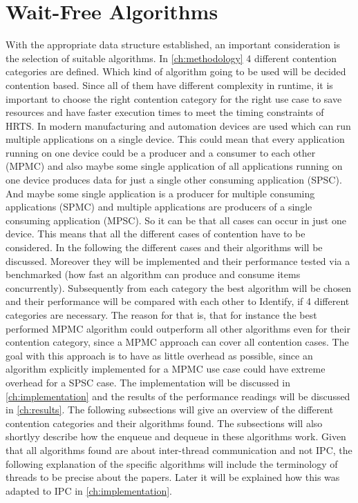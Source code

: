 \section{Wait-Free Algorithms}\label{sec:wait-free-alg}
With the appropriate data structure established, an important consideration is the selection of suitable algorithms. In \cref{ch:methodology} 4 different contention categories are defined. Which kind of algorithm going to be used will be decided contention based. Since all of them have different complexity in runtime, it is important to choose the right contention category for the right use case to save resources and have faster execution times to meet the timing constraints of \ac{HRTS}. In modern manufacturing and automation devices are used which can run multiple applications on a single device. This could mean that every application running on one device could be a producer and a consumer to each other (\ac{MPMC}) and also maybe some single application of all applications running on one device produces data for just a single other consuming application (\ac{SPSC}). And maybe some single application is a producer for multiple consuming applications (\ac{SPMC}) and multiple applications are producers of a single consuming application (\ac{MPSC}). So it can be that all cases can occur in just one device. This means that all the different cases of contention have to be considered. In the following the different cases and their algorithms will be discussed. Moreover they will be implemented and their performance tested via a benchmarked (how fast an algorithm can produce and consume items concurrently). Subsequently from each category the best algorithm will be chosen and their performance will be compared with each other to Identify, if 4 different categories are necessary. The reason for that is, that for instance the best performed \ac{MPMC} algorithm could outperform all other algorithms even for their contention category, since a \ac{MPMC} approach can cover all contention cases. The goal with this approach is to have as little overhead as possible, since an algorithm explicitly implemented for a \ac{MPMC} use case could have extreme overhead for a \ac{SPSC} case. The implementation will be discussed in \cref{ch:implementation} and the results of the performance readings will be discussed in \cref{ch:results}. The following subsections will give an overview of the different contention categories and their algorithms found. The subsections will also shortlyy describe how the enqueue and dequeue in these algorithms work. Given that all algorithms found are about inter-thread communication and not \ac{IPC}, the following explanation of the specific algorithms will include the terminology of threads to be precise about the papers. Later it will be explained how this was adapted to \ac{IPC} in \cref{ch:implementation}.

